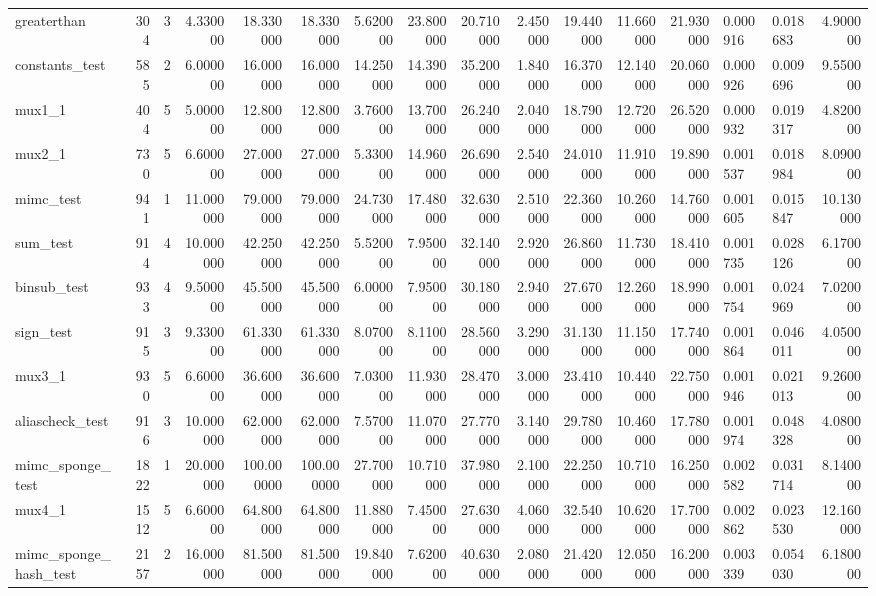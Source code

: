 \begin{tabular}{lrrrrrrrrrrrrllr}
greaterthan & 304 & 3 & 4.330000 & 18.330000 & 18.330000 & 5.620000 & 23.800000 & 20.710000 & 2.450000 & 19.440000 & 11.660000 & 21.930000 & 0.000916 & 0.018683 & 4.900000 \\
constants\_test & 585 & 2 & 6.000000 & 16.000000 & 16.000000 & 14.250000 & 14.390000 & 35.200000 & 1.840000 & 16.370000 & 12.140000 & 20.060000 & 0.000926 & 0.009696 & 9.550000 \\
mux1\_1 & 404 & 5 & 5.000000 & 12.800000 & 12.800000 & 3.760000 & 13.700000 & 26.240000 & 2.040000 & 18.790000 & 12.720000 & 26.520000 & 0.000932 & 0.019317 & 4.820000 \\
mux2\_1 & 730 & 5 & 6.600000 & 27.000000 & 27.000000 & 5.330000 & 14.960000 & 26.690000 & 2.540000 & 24.010000 & 11.910000 & 19.890000 & 0.001537 & 0.018984 & 8.090000 \\
mimc\_test & 941 & 1 & 11.000000 & 79.000000 & 79.000000 & 24.730000 & 17.480000 & 32.630000 & 2.510000 & 22.360000 & 10.260000 & 14.760000 & 0.001605 & 0.015847 & 10.130000 \\
sum\_test & 914 & 4 & 10.000000 & 42.250000 & 42.250000 & 5.520000 & 7.950000 & 32.140000 & 2.920000 & 26.860000 & 11.730000 & 18.410000 & 0.001735 & 0.028126 & 6.170000 \\
binsub\_test & 933 & 4 & 9.500000 & 45.500000 & 45.500000 & 6.000000 & 7.950000 & 30.180000 & 2.940000 & 27.670000 & 12.260000 & 18.990000 & 0.001754 & 0.024969 & 7.020000 \\
sign\_test & 915 & 3 & 9.330000 & 61.330000 & 61.330000 & 8.070000 & 8.110000 & 28.560000 & 3.290000 & 31.130000 & 11.150000 & 17.740000 & 0.001864 & 0.046011 & 4.050000 \\
mux3\_1 & 930 & 5 & 6.600000 & 36.600000 & 36.600000 & 7.030000 & 11.930000 & 28.470000 & 3.000000 & 23.410000 & 10.440000 & 22.750000 & 0.001946 & 0.021013 & 9.260000 \\
aliascheck\_test & 916 & 3 & 10.000000 & 62.000000 & 62.000000 & 7.570000 & 11.070000 & 27.770000 & 3.140000 & 29.780000 & 10.460000 & 17.780000 & 0.001974 & 0.048328 & 4.080000 \\
mimc\_sponge\_test & 1822 & 1 & 20.000000 & 100.000000 & 100.000000 & 27.700000 & 10.710000 & 37.980000 & 2.100000 & 22.250000 & 10.710000 & 16.250000 & 0.002582 & 0.031714 & 8.140000 \\
mux4\_1 & 1512 & 5 & 6.600000 & 64.800000 & 64.800000 & 11.880000 & 7.450000 & 27.630000 & 4.060000 & 32.540000 & 10.620000 & 17.700000 & 0.002862 & 0.023530 & 12.160000 \\
mimc\_sponge\_hash\_test & 2157 & 2 & 16.000000 & 81.500000 & 81.500000 & 19.840000 & 7.620000 & 40.630000 & 2.080000 & 21.420000 & 12.050000 & 16.200000 & 0.003339 & 0.054030 & 6.180000 \\

\end{tabular}
